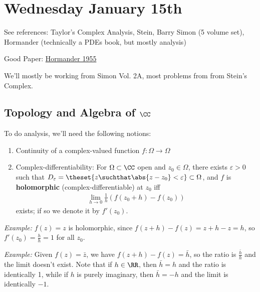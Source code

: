 \hypertarget{wednesday-january-15th}{%
\section{Wednesday January 15th}\label{wednesday-january-15th}}

See references: Taylor's Complex Analysis, Stein, Barry Simon (5 volume
set), Hormander (technically a PDEs book, but mostly analysis)

Good Paper:
\href{https://projecteuclid.org/download/pdf_1/euclid.acta/1485892151}{Hormander
1955}

We'll mostly be working from Simon Vol. 2A, most problems from from
Stein's Complex.

\hypertarget{topology-and-algebra-of-cc}{%
\subsection{\texorpdfstring{Topology and Algebra of
\(\CC\)}{Topology and Algebra of \textbackslash CC}}\label{topology-and-algebra-of-cc}}

To do analysis, we'll need the following notions:

\begin{enumerate}
\def\labelenumi{\arabic{enumi}.}
\tightlist
\item
  Continuity of a complex-valued function \(f: \Omega \to \Omega\)
\item
  Complex-differentiability: For \(\Omega \subset \CC\) open and
  \(z_0 \in \Omega\), there exists \(\varepsilon > 0\) such that
  \(D_\varepsilon = \theset{z \suchthat \abs{z - z_0} < \varepsilon} \subset \Omega\),
  and \(f\) is \textbf{holomorphic} (complex-differentiable) at \(z_0\)
  iff
  \begin{align*}\lim_{h\to 0} \frac 1 h (f(z_0 + h) - f(z_0))\end{align*}
  exists; if so we denote it by \(f'(z_0)\).
\end{enumerate}

\emph{Example:} \(f(z) = z\) is holomorphic, since
\(f(z+ h) - f(z) = z+h-z = h\), so \(f'(z_0) = \frac h h = 1\) for all
\(z_0\).

\emph{Example:} Given \(f(z) = \bar z\), we have
\(f(z+h)-f(z) = \bar h\), so the ratio is \(\frac{\bar h}{h}\) and the
limit doesn't exist. Note that if \(h\in \RR\), then \(\bar h = h\) and
the ratio is identically 1, while if \(h\) is purely imaginary, then
\(\bar h = -h\) and the limit is identically \(-1\).

